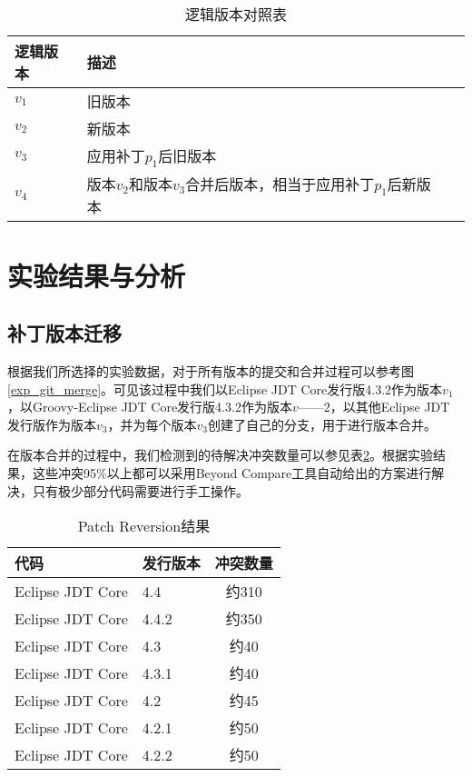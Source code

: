 \begin{table}
	\caption{逻辑版本对照表}
	\label{exp_version}
	\centering
	\begin{tabular}{llc}
		\toprule[1.5pt]
		{\heiti 逻辑版本} & {\heiti 描述} \\\midrule[1pt]
		$v_1$ & 旧版本 \\
		$v_2$ & 新版本\\
		$v_3$ & 应用补丁$p_1$后旧版本\\
		$v_4$ & 版本$v_2$和版本$v_3$合并后版本，相当于应用补丁$p_1$后新版本\\
		\bottomrule[1.5pt]
	\end{tabular}
\end{table}

\section{实验结果与分析}
\subsection{补丁版本迁移}

根据我们所选择的实验数据，对于所有版本的提交和合并过程可以参考图\ref {exp_git_merge}。可见该过程中我们以Eclipse JDT Core发行版4.3.2作为版本$v_1$，以Groovy-Eclipse JDT Core发行版4.3.2作为版本$v——2$，以其他Eclipse JDT 发行版作为版本$v_3$，并为每个版本$v_3$创建了自己的分支，用于进行版本合并。


在版本合并的过程中，我们检测到的待解决冲突数量可以参见表\ref {data_git_merge}。根据实验结果，这些冲突95\%以上都可以采用Beyond Compare工具自动给出的方案进行解决，只有极少部分代码需要进行手工操作。

\begin{table}
	\caption{Patch Reversion结果}
	\label{data_git_merge}
	\centering
	\begin{tabular}{llc}
		\toprule[1.5pt]
		{\heiti 代码} & {\heiti 发行版本} & {\heiti 冲突数量} \\\midrule[1pt]
		Eclipse JDT Core & 4.4 & 约310\\
		Eclipse JDT Core & 4.4.2 & 约350\\
		Eclipse JDT Core & 4.3 & 约40\\
		Eclipse JDT Core & 4.3.1 & 约40\\
		Eclipse JDT Core & 4.2 & 约45\\
		Eclipse JDT Core & 4.2.1 & 约50\\
		Eclipse JDT Core & 4.2.2 & 约50\\
		\bottomrule[1.5pt]
	\end{tabular}
\end{table}


